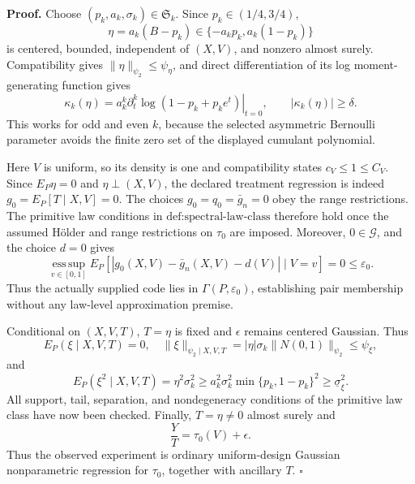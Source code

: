 \textbf{Proof.}
Choose \((p_k,a_k,\sigma_k)\in\mathfrak S_k\).  Since \(p_k\in(1/4,3/4)\),
\[
 \eta=a_k(B-p_k)\in\{-a_kp_k,a_k(1-p_k)\}
\]
is centered, bounded, independent of \((X,V)\), and nonzero almost surely.  Compatibility gives \(\|\eta\|_{\psi_2}\le\psi_\eta\), and direct differentiation of its log moment-generating function gives
\[
 \kappa_k(\eta)=a_k^k\left.\partial_t^k\log(1-p_k+p_ke^t)\right|_{t=0},
 \qquad |\kappa_k(\eta)|\ge\delta. \tag{1}
\]
This works for odd and even \(k\), because the selected asymmetric Bernoulli parameter avoids the finite zero set of the displayed cumulant polynomial.

Here \(V\) is uniform, so its density is one and compatibility states \(c_V\le1\le C_V\).  Since \(E_P\eta=0\) and \(\eta\perp(X,V)\), the declared treatment regression is indeed \(g_0=E_P[T\mid X,V]=0\).  The choices \(g_0=q_0=\bar g_n=0\) obey the range restrictions.  The primitive law conditions in \(\text{def:spectral-law-class}\) therefore hold once the assumed H\"older and range restrictions on \(\tau_0\) are imposed.  Moreover, \(0\in\mathcal G\), and the choice \(d=0\) gives
\[
 \operatorname*{ess\,sup}_{v\in[0,1]}
 E_P[|g_0(X,V)-\bar g_n(X,V)-d(V)|\mid V=v]=0\le\varepsilon_0. \tag{2}
\]
Thus the actually supplied code lies in \(\Gamma(P,\varepsilon_0)\), establishing pair membership without any law-level approximation premise.

Conditional on \((X,V,T)\), \(T=\eta\) is fixed and \(\epsilon\) remains centered Gaussian.  Thus
\[
 E_P(\xi\mid X,V,T)=0,
 \quad
 \|\xi\|_{\psi_2\mid X,V,T}
 =|\eta|\sigma_k\|N(0,1)\|_{\psi_2}
 \le\psi_\xi, \tag{3}
\]
and
\[
 E_P(\xi^2\mid X,V,T)=\eta^2\sigma_k^2
 \ge a_k^2\sigma_k^2\min\{p_k,1-p_k\}^2
 \ge\underline\sigma_\xi^2. \tag{4}
\]
All support, tail, separation, and nondegeneracy conditions of the primitive law class have now been checked.  Finally, \(T=\eta\ne0\) almost surely and
\[
 \frac{Y}{T}=\tau_0(V)+\epsilon. \tag{5}
\]
Thus the observed experiment is ordinary uniform-design Gaussian nonparametric regression for \(\tau_0\), together with ancillary \(T\). \(\square\)
